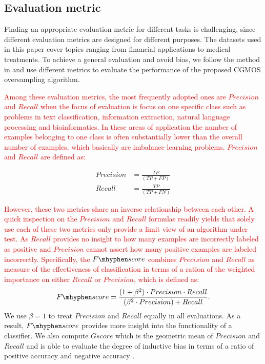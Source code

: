 \documentclass[10pt,journal,compsoc]{IEEEtran}
\newcommand\fscore{\mathop{F\mhyphen score}}
\begin{document}
\subsection{Evaluation metric}
Finding an appropriate evaluation metric for different tasks is challenging, since different evaluation metrics are designed for different purposes. The datasets used in this paper cover topics ranging from financial applications to medical treatments. To achieve a general evaluation and avoid bias, we follow the method in \cite{CNV:02}\cite{HH:05}\cite{HH:08}\cite{barua2014mwmote}\cite{chen2010ramoboost} and use different metrics to evaluate the performance of the proposed CGMOS oversampling algorithm.

\textcolor{red}{Among these evaluation metrics, the most frequently adopted ones are $Precision$ and $Recall$ when the focus of evaluation is focus on one specific class such as problems in text classification, information extraction, natural language processing and bioinformatics. In these areas of application the number of examples belonging to one class is often substantially lower than the overall number of examples, which basically are imbalance learning problems. $Precision$ and $Recall$ are defined as:}

\begin{align*}
Precision &= \frac{TP}{(TP + FP)}\\
Recall &= \frac{TP}{(TP+FN)}  
\end{align*}

\textcolor{red}{However, these two metrics share an inverse relationship between each other. A quick inspection on the $Precision$ and $Recall$ formulas readily yields that solely use each of these two metrics only provide a limit view of an algorithm under test. As $Recall$ provides no insight to how many examples are incorrectly labeled as positive and $Precision$ cannot assert how many positive examples are labeled incorrectly. Specifically, the $\fscore$ combines $Precision$ and $Recall$ as measure of the effectiveness of classification in terms of a ration of the weighted importance on either $Recall$ or $Precision$, which is defined as:}
\begin{align*}
\fscore = \frac{(1+\beta^2)\cdot Precision \cdot Recall}{(\beta^2\cdot Precision)+ Recall}.
\end{align*}
We use $\beta=1$ to treat $Precision$ and $Recall$ equally in all evaluations. As a result, $\fscore$ provides more insight into the functionality of a classifier. We also compute $Gscore$ which is the geometric mean of $Precision$ and $Recall$ and is able to evaluate the degree of inductive bias in terms of a ratio of positive accuracy and negative accuracy \cite{HH:09}.
\end{document}
